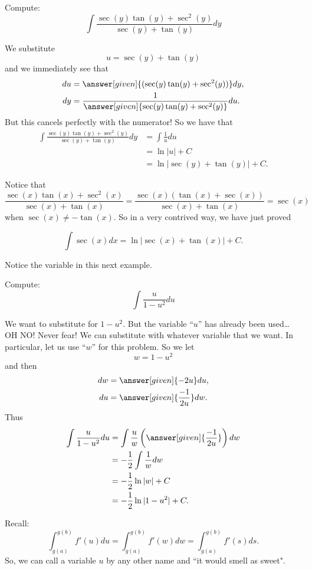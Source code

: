 \documentclass{ximera}
\begin{document}
\begin{example}
Compute:
\[
\int \frac{\sec(y) \tan(y) + \sec^2(y)}{\sec(y) + \tan(y)} dy
\]
\begin{explanation}
We substitute
\[
u = \sec(y) + \tan(y)
\]
and we immediately see that
\begin{align*}
  du &= \answer[given]{(\sec(y) \tan(y) + \sec^2(y))} dy,\\
  dy &= \frac{1}{\answer[given]{\sec(y) \tan(y) + \sec^2(y)}} du.
\end{align*}
But this cancels perfectly with the numerator!  
So we have that
\begin{align*}
\int \frac{\sec(y) \tan(y) + \sec^2(y)}{\sec(y) + \tan(y)} dy &= \int \frac{1}{u} du  \\
&= \ln|u| + C  \\
&= \ln| \sec(y) + \tan(y) | + C.
\end{align*}
\end{explanation}
\end{example}



Notice that 
\[
\frac{\sec(x) \tan(x) + \sec^2(x)}{\sec(x) + \tan(x)} = \frac{\sec(x) (\tan(x) + \sec(x))}{\sec(x) + \tan(x)} = \sec(x)
\]
when $\sec(x) \neq - \tan(x)$.  
So in a very contrived way, we have just proved

\begin{theorem}
\[
\int \sec(x) dx = \ln|\sec(x) + \tan(x)| + C.
\]
\end{theorem}


Notice the variable in this next example.


\begin{example}\label{key example}
Compute:
\[
\int \frac{u}{1-u^2} du
\]
\begin{explanation}
We want to substitute for $1-u^2$.  
But the variable ``$u$'' has already been used\dots OH NO!
Never fear! We can substitute with whatever variable that we want.  
In particular, let us use ``$w$'' for this problem.  
So we let
\[
w = 1 - u^2
\]
and then
\begin{align*}
  dw &= \answer[given]{-2u} du,\\
  du &= \answer[given]{\frac{-1}{2u}} dw.
\end{align*}
Thus
\begin{align*}
\int \frac{u}{1-u^2} du &= \int \frac{u}{w} \left( \answer[given]{\frac{-1}{2u}} \right) dw  \\
&= - \frac{1}{2} \int \frac{1}{w} dw  \\
&= - \frac{1}{2} \ln|w| + C  \\
&= - \frac{1}{2} \ln|1-u^2| + C.
\end{align*}
\end{explanation}
Recall:
\[
\int_{g(a)}^{g(b)} f'(u) du=\int_{g(a)}^{g(b)} f'(w) dw=\int_{g(a)}^{g(b)} f'(s) ds.
\]
So, we can call a variable $u$ by any other name and ``it would smell as sweet".

\end{example}
\end{document}
